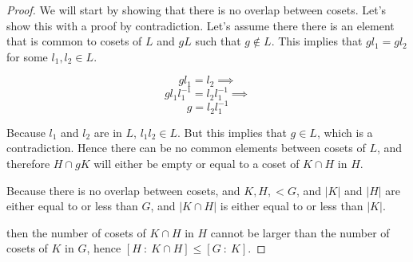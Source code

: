 \documentclass[a4paper]{article}
\begin{document}
\begin{myparindent}{0pt}
\begin{proof}
  We will start by showing that there is no overlap between cosets. Let's show
  this with a proof by contradiction. Let's assume there there is an element
  that is common to cosets of $L$ and $gL$ such that $g \notin L$.
  This implies that $g l_1 = g l_2$ for some $l_1, l_2 \in L$.

  \[ g l_1 = l_2 \implies \]
  \[ g l_1 l_1^{-1} = l_2 l_1^{-1} \implies \]
  \[ g = l_2 l_1^{-1} \]

  Because $l_1$ and $l_2$ are in $L$, $l_1 l_2 \in L$. But this implies that
  $g \in L$, which is a contradiction. Hence there can be no common elements
  between cosets of $L$, and therefore $H \cap gK$ will either be empty or
  equal to a coset of $K \cap H$ in $H$. \newline

  Because there is no overlap between cosets, and $K, H, < G$, and $|K|$ and
  $|H|$ are either equal to or less than $G$, and $|K \cap H|$ is either equal
  to or less than $|K|$.

  then the number of cosets of $K \cap H$ in $H$ cannot be larger than the
  number of cosets of $K$ in $G$, hence $[H ~: ~K \cap H] \le [G ~: ~K]$.
\end{proof}

\end{myparindent}
\end{document}
